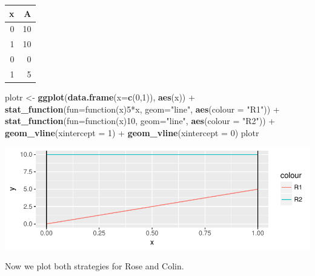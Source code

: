 \documentclass[]{article}
\newenvironment{Shaded}{\begin{snugshade}}{\end{snugshade}}
\newcommand{\KeywordTok}[1]{\textcolor[rgb]{0.13,0.29,0.53}{\textbf{{#1}}}}
\newcommand{\DataTypeTok}[1]{\textcolor[rgb]{0.13,0.29,0.53}{{#1}}}
\newcommand{\DecValTok}[1]{\textcolor[rgb]{0.00,0.00,0.81}{{#1}}}
\newcommand{\StringTok}[1]{\textcolor[rgb]{0.31,0.60,0.02}{{#1}}}
\newcommand{\NormalTok}[1]{{#1}}
\begin{document}
\begin{longtable}[]{@{}rr@{}}
\toprule
x & A\tabularnewline
\midrule
\endhead
0 & 10\tabularnewline
1 & 10\tabularnewline
0 & 0\tabularnewline
1 & 5\tabularnewline
\bottomrule
\end{longtable}

\begin{Shaded}
\begin{Highlighting}[]
\NormalTok{plotr <-}\StringTok{ }\KeywordTok{ggplot}\NormalTok{(}\KeywordTok{data.frame}\NormalTok{(}\DataTypeTok{x=}\KeywordTok{c}\NormalTok{(}\DecValTok{0}\NormalTok{,}\DecValTok{1}\NormalTok{)), }\KeywordTok{aes}\NormalTok{(x)) +}
\StringTok{          }\KeywordTok{stat_function}\NormalTok{(}\DataTypeTok{fun=}\NormalTok{function(x)}\DecValTok{5}\NormalTok{*x, }\DataTypeTok{geom=}\StringTok{"line"}\NormalTok{, }\KeywordTok{aes}\NormalTok{(}\DataTypeTok{colour =} \StringTok{"R1"}\NormalTok{)) +}
\StringTok{          }\KeywordTok{stat_function}\NormalTok{(}\DataTypeTok{fun=}\NormalTok{function(x)}\DecValTok{10}\NormalTok{, }\DataTypeTok{geom=}\StringTok{"line"}\NormalTok{, }\KeywordTok{aes}\NormalTok{(}\DataTypeTok{colour =} \StringTok{"R2"}\NormalTok{)) +}\StringTok{ }
\StringTok{            }\KeywordTok{geom_vline}\NormalTok{(}\DataTypeTok{xintercept =} \DecValTok{1}\NormalTok{) +}\StringTok{ }
\StringTok{          }\KeywordTok{geom_vline}\NormalTok{(}\DataTypeTok{xintercept =} \DecValTok{0}\NormalTok{)}
\NormalTok{plotr}
\end{Highlighting}
\end{Shaded}

\includegraphics{Christophe_Hunt_hw9_files/figure-latex/unnamed-chunk-6-1.pdf}
\newpage

Now we plot both strategies for Rose and Colin.
\end{document}
